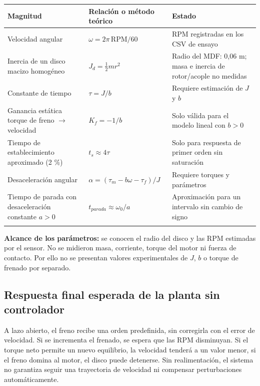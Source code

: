 \documentclass[9pt,a4paper,twocolumn]{extarticle}
\renewcommand{\arraystretch}{1.08}
\begin{document}
\begin{center}\begingroup\setlength{\tabcolsep}{2pt}\renewcommand{\arraystretch}{1.15}\scriptsize
\begin{tabularx}{\columnwidth}{@{}YYY@{}}
\toprule
\textbf{Magnitud} & \textbf{Relación o método teórico} & \textbf{Estado}\\
\midrule
Velocidad angular & $\omega=2\pi\,\mathrm{RPM}/60$ & RPM registradas en los CSV de ensayo\\
\addlinespace[2pt]
Inercia de un disco macizo homogéneo & $J_d=\tfrac12 mr^2$ & Radio del MDF: 0,06 m; masa e inercia de rotor/acople no medidas\\
\addlinespace[2pt]
Constante de tiempo & $\tau=J/b$ & Requiere estimación de $J$ y $b$\\
\addlinespace[2pt]
Ganancia estática torque de freno $\rightarrow$ velocidad & $K_f=-1/b$ & Solo válida para el modelo lineal con $b>0$\\
\addlinespace[2pt]
Tiempo de establecimiento aproximado (2 \%) & $t_s\approx4\tau$ & Solo para respuesta de primer orden sin saturación\\
\addlinespace[2pt]
Desaceleración angular & $\alpha=(\tau_m-b\omega-\tau_f)/J$ & Requiere torques y parámetros\\
\addlinespace[2pt]
Tiempo de parada con desaceleración constante $a>0$ & $t_{parada}\approx\omega_0/a$ & Aproximación para un intervalo sin cambio de signo\\
\addlinespace[2pt]
\bottomrule
\end{tabularx}\endgroup\end{center}

\textbf{Alcance de los parámetros:} se conocen el radio del disco y las
RPM estimadas por el sensor. No se midieron masa, corriente, torque
del motor ni fuerza de contacto. Por ello no se presentan valores
experimentales de $J$, $b$ o torque de frenado por separado.

\subsection{Respuesta final esperada de la planta sin
controlador}

A lazo abierto, el freno recibe una orden predefinida, sin
corregirla con el error de velocidad. Si se incrementa el frenado, se
espera que las RPM disminuyan. Si el torque neto permite un nuevo
equilibrio, la velocidad tenderá a un valor menor, si el freno domina al
motor, el disco puede detenerse. Sin realimentación, el sistema
no garantiza seguir una trayectoria de velocidad ni compensar
perturbaciones automáticamente.
\end{document}
